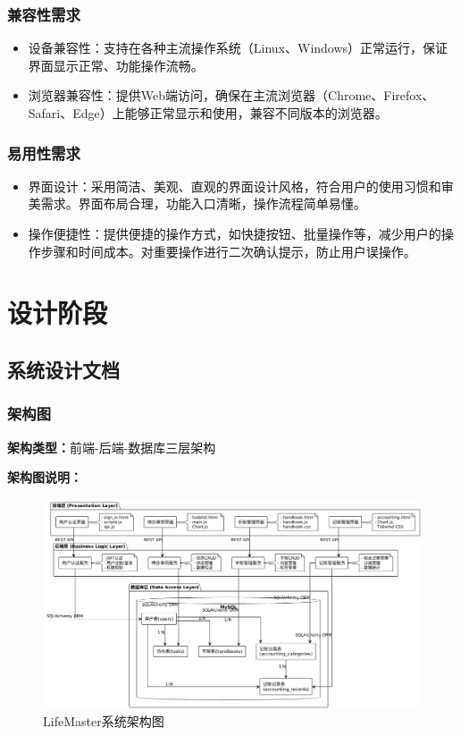\documentclass[a4paper]{article}
\begin{document}
\subsubsection{兼容性需求}

\begin{itemize}
    \item 设备兼容性：支持在各种主流操作系统（Linux、Windows）正常运行，保证界面显示正常、功能操作流畅。
    \item 浏览器兼容性：提供Web端访问，确保在主流浏览器（Chrome、Firefox、Safari、Edge）上能够正常显示和使用，兼容不同版本的浏览器。
\end{itemize}

\subsubsection{易用性需求}

\begin{itemize}
    \item 界面设计：采用简洁、美观、直观的界面设计风格，符合用户的使用习惯和审美需求。界面布局合理，功能入口清晰，操作流程简单易懂。
    \item 操作便捷性：提供便捷的操作方式，如快捷按钮、批量操作等，减少用户的操作步骤和时间成本。对重要操作进行二次确认提示，防止用户误操作。
\end{itemize}

\section{设计阶段}

\subsection{系统设计文档}

\subsubsection{架构图}

\textbf{架构类型：}前端-后端-数据库三层架构

\textbf{架构图说明：}

\begin{figure}[H]
\centering
\includegraphics[width=1.0\textwidth]{img/architecture.png}
\caption{LifeMaster系统架构图}
\end{figure}
\end{document}
